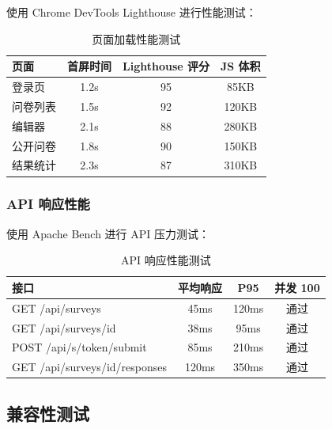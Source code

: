 使用 Chrome DevTools Lighthouse 进行性能测试：

\begin{table}[H]
\centering
\caption{页面加载性能测试}
\label{tab:perf-test}
\begin{tabular}{lccc}
\toprule
\textbf{页面} & \textbf{首屏时间} & \textbf{Lighthouse 评分} & \textbf{JS 体积} \\
\midrule
登录页 & 1.2s & 95 & 85KB \\
问卷列表 & 1.5s & 92 & 120KB \\
编辑器 & 2.1s & 88 & 280KB \\
公开问卷 & 1.8s & 90 & 150KB \\
结果统计 & 2.3s & 87 & 310KB \\
\bottomrule
\end{tabular}
\end{table}

\subsubsection{API 响应性能}

使用 Apache Bench 进行 API 压力测试：

\begin{table}[H]
\centering
\caption{API 响应性能测试}
\label{tab:api-perf}
\begin{tabular}{lccc}
\toprule
\textbf{接口} & \textbf{平均响应} & \textbf{P95} & \textbf{并发 100} \\
\midrule
GET /api/surveys & 45ms & 120ms & 通过 \\
GET /api/surveys/{id} & 38ms & 95ms & 通过 \\
POST /api/s/{token}/submit & 85ms & 210ms & 通过 \\
GET /api/surveys/{id}/responses & 120ms & 350ms & 通过 \\
\bottomrule
\end{tabular}
\end{table}

\subsection{兼容性测试}

